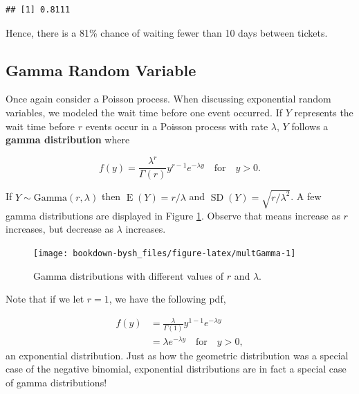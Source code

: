 \documentclass[
]{krantz}
\newcommand{\E}{\operatorname{E}}
\newcommand{\SD}{\operatorname{SD}}
\begin{document}
\begin{verbatim}
## [1] 0.8111
\end{verbatim}

Hence, there is a 81\% chance of waiting fewer than 10 days between tickets.

\hypertarget{gamma-random-variable}{%
\subsection{Gamma Random Variable}\label{gamma-random-variable}}

Once again consider a Poisson process. When discussing exponential random variables, we modeled the wait time before one event occurred. If \(Y\) represents the wait time before \(r\) events occur in a Poisson process with rate \(\lambda\), \(Y\) follows a \textbf{gamma distribution}  where

\begin{equation}
f(y) = \frac{\lambda^r}{\Gamma(r)} y^{r-1} e^{-\lambda y}\quad \textrm{for} \quad y >0.
\label{eq:gammaRV}
\end{equation}

If \(Y \sim \textrm{Gamma}(r, \lambda)\) then \(\E(Y) = r/\lambda\) and \(\SD(Y) = \sqrt{r/\lambda^2}\). A few gamma distributions are displayed in Figure \ref{fig:multGamma}. Observe that means increase as \(r\) increases, but decrease as \(\lambda\) increases.



\begin{figure}

{\centering \texttt{[image: bookdown-bysh\_files/figure-latex/multGamma-1]} 

}

\caption{Gamma distributions with different values of \(r\) and \(\lambda\).}\label{fig:multGamma}
\end{figure}

Note that if we let \(r = 1\), we have the following pdf,

\begin{align*}
 f(y) &= \frac{\lambda}{\Gamma(1)} y^{1-1} e^{-\lambda y} \\
      &= \lambda e^{-\lambda y} \quad \textrm{for} \quad y > 0,
\end{align*}
an exponential distribution. Just as how the geometric distribution was a special case of the negative binomial, exponential distributions are in fact a special case of gamma distributions!
\end{document}
